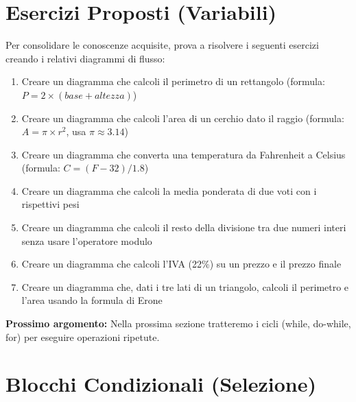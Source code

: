 \documentclass[a4paper,16pt]{article}
\begin{document}
\section{Esercizi Proposti (Variabili)}

Per consolidare le conoscenze acquisite, prova a risolvere i seguenti esercizi creando i relativi diagrammi di flusso:

\begin{enumerate}[leftmargin=*]
    \item Creare un diagramma che calcoli il perimetro di un rettangolo (formula: $P = 2 \times (base + altezza)$)
    
    \item Creare un diagramma che calcoli l'area di un cerchio dato il raggio (formula: $A = \pi \times r^2$, usa $\pi \approx 3.14$)
    
    \item Creare un diagramma che converta una temperatura da Fahrenheit a Celsius (formula: $C = (F - 32) / 1.8$)
    
    \item Creare un diagramma che calcoli la media ponderata di due voti con i rispettivi pesi
    
    \item Creare un diagramma che calcoli il resto della divisione tra due numeri interi senza usare l'operatore modulo
    
    \item Creare un diagramma che calcoli l'IVA (22\%) su un prezzo e il prezzo finale
    
    \item Creare un diagramma che, dati i tre lati di un triangolo, calcoli il perimetro e l'area usando la formula di Erone
\end{enumerate}

\vspace{1cm}
\begin{tcolorbox}[colback=yellow!10!white,colframe=orange!75!black,title=Nota]
\textbf{Prossimo argomento:} Nella prossima sezione tratteremo i cicli (while, do-while, for) per eseguire operazioni ripetute.
\end{tcolorbox}

\newpage

\section{Blocchi Condizionali (Selezione)}
\end{document}
